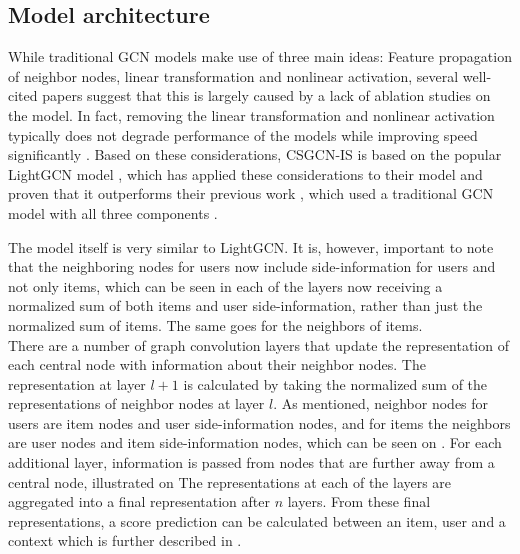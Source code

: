 \subsection{Model architecture}\label{subsec:csgcn_is_model_architecture}
While traditional GCN models make use of three main ideas: Feature propagation of neighbor nodes, linear transformation and nonlinear activation, several well-cited papers \cite{SimplifyingGCN,LightGCN,HeteGCN} suggest that this is largely caused by a lack of ablation studies on the model.
In fact, removing the linear transformation and nonlinear activation typically does not degrade performance of the models while improving speed significantly \cite{SimplifyingGCN}.
Based on these considerations, CSGCN-IS is based on the popular LightGCN model \cite{LightGCN}, which has applied these considerations to their model and proven that it outperforms their previous work \cite{NGCF}, which used a traditional GCN model with all three components \cite{LightGCN}.

The model itself is very similar to LightGCN.
It is, however, important to note that the neighboring nodes for users now include side-information for users and not only items, which can be seen in each of the layers now receiving a normalized sum of both items and user side-information, rather than just the normalized sum of items.
The same goes for the neighbors of items.
\\
There are a number of graph convolution layers that update the representation of each central node with information about their neighbor nodes.
The representation at layer $l+1$ is calculated by taking the normalized sum of the representations of neighbor nodes at layer $l$. 
As mentioned, neighbor nodes for users are item nodes and user side-information nodes, and for items the neighbors are user nodes and item side-information nodes, which can be seen on .
For each additional layer, information is passed from nodes that are further away from a central node, illustrated on 
The representations at each of the layers are aggregated into a final representation after $n$ layers.
From these final representations, a score prediction can be calculated between an item, user and a context which is further described in .



